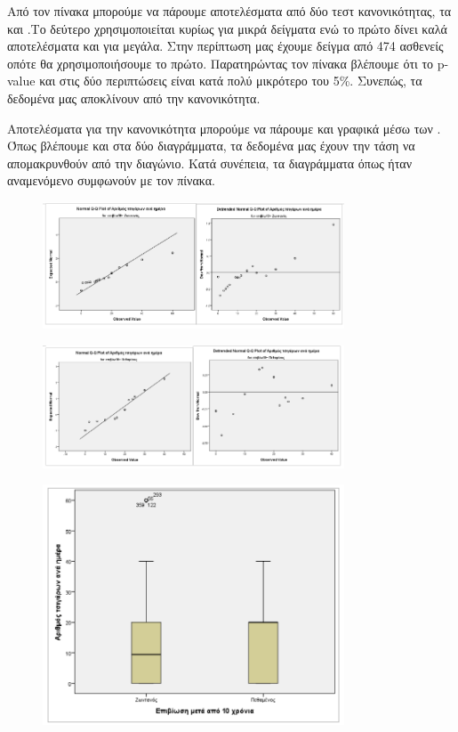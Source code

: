 Από τον πίνακα  μπορούμε να πάρουμε αποτελέσματα από δύο τεστ κανονικότητας, τα  και .Το δεύτερο χρησιμοποιείται κυρίως για μικρά δείγματα ενώ το πρώτο δίνει καλά  αποτελέσματα και για μεγάλα. Στην περίπτωση μας έχουμε δείγμα από 474 ασθενείς οπότε θα χρησιμοποιήσουμε το πρώτο. Παρατηρώντας τον πίνακα βλέπουμε ότι το p-value και στις δύο περιπτώσεις είναι κατά πολύ μικρότερο του 5\%. Συνεπώς, τα δεδομένα μας αποκλίνουν από την κανονικότητα.

Αποτελέσματα για την κανονικότητα μπορούμε να πάρουμε και γραφικά μέσω των . Όπως βλέπουμε και στα δύο διαγράμματα, τα δεδομένα μας έχουν την τάση να απομακρυνθούν από την διαγώνιο. Κατά συνέπεια, τα διαγράμματα όπως ήταν αναμενόμενο συμφωνούν με τον πίνακα.


\begin{figure}[h]
    \centering
    \includegraphics[width=0.8\textwidth]{images/111.PNG}
\end{figure}

\begin{figure}[h]
    \centering
    \includegraphics[width=0.8\textwidth]{images/112.PNG}
\end{figure}

\clearpage

\begin{figure}[h]
    \centering
    \includegraphics[width=0.8\textwidth]{images/113.PNG}
\end{figure}

